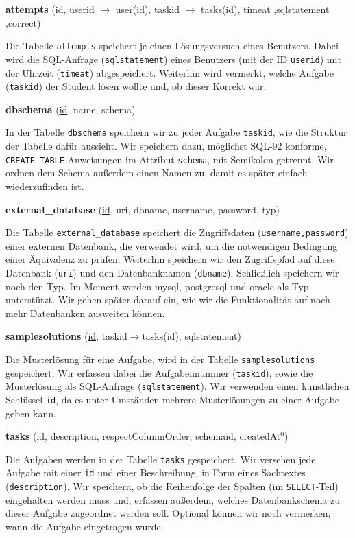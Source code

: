 \textbf{attempts} (\underline{id}, userid $\to$ user(id), taskid $\to$ tasks(id), timeat ,sqlstatement ,correct)

Die Tabelle \verb|attempts| speichert je einen Lösungsversuch eines Benutzers. Dabei wird die SQL-Anfrage (\verb|sqlstatement|) eines Benutzers (mit der ID \verb|userid|) mit der Uhrzeit (\verb|timeat|) abgespeichert. Weiterhin wird vermerkt, welche Aufgabe (\verb|taskid|) der Student lösen wollte und, ob dieser Korrekt war.

\textbf{dbschema} (\underline{id}, name, schema)

In der Tabelle \verb|dbschema| speichern wir zu jeder Aufgabe \verb|taskid|, wie die Struktur der Tabelle dafür aussieht. Wir speichern dazu, möglichst SQL-92 konforme, \verb|CREATE TABLE|-Anweisungen im Attribut \verb|schema|, mit Semikolon getrennt. Wir ordnen dem Schema außerdem einen Namen zu, damit es später einfach wiederzufinden ist.

\textbf{external\_database} (\underline{id}, uri, dbname, username, password, typ)

Die Tabelle \verb|external_database| speichert die Zugriffsdaten (\verb|username,password|) einer externen Datenbank, die verwendet wird, um die notwendigen Bedingung einer Äquivalenz zu prüfen. Weiterhin speichern wir den Zugriffspfad auf diese Datenbank (\verb|uri|) und den Datenbanknamen (\verb|dbname|). Schließlich speichern wir noch den Typ. Im Moment werden mysql, postgresql und oracle als Typ unterstützt. Wir gehen später darauf ein, wie wir die Funktionalität auf noch mehr Datenbanken ausweiten können.

\textbf{samplesolutions} (\underline{id}, taskid$\to$tasks(id), sqlstatement)

Die Musterlösung für eine Aufgabe, wird in der Tabelle \verb|samplesolutions| gespeichert. Wir erfassen dabei die Aufgabennummer (\verb|taskid|), sowie die Musterlösung als SQL-Anfrage (\verb|sqlstatement|). Wir verwenden einen künstlichen Schlüssel \verb|id|, da es unter Umständen mehrere Musterlösungen zu einer Aufgabe geben kann.

\textbf{tasks} (\underline{id}, description, respectColumnOrder, schemaid, createdAt$^0$)

Die Aufgaben werden in der Tabelle \verb|tasks| gespeichert. Wir versehen jede Aufgabe mit einer \verb|id| und einer Beschreibung, in Form eines Sachtextes (\verb|description|). Wir speichern, ob die Reihenfolge der Spalten (im \verb|SELECT|-Teil) eingehalten werden muss und, erfassen außerdem, welches Datenbankschema zu dieser Aufgabe zugeordnet werden soll. Optional können wir noch vermerken, wann die Aufgabe eingetragen wurde.

